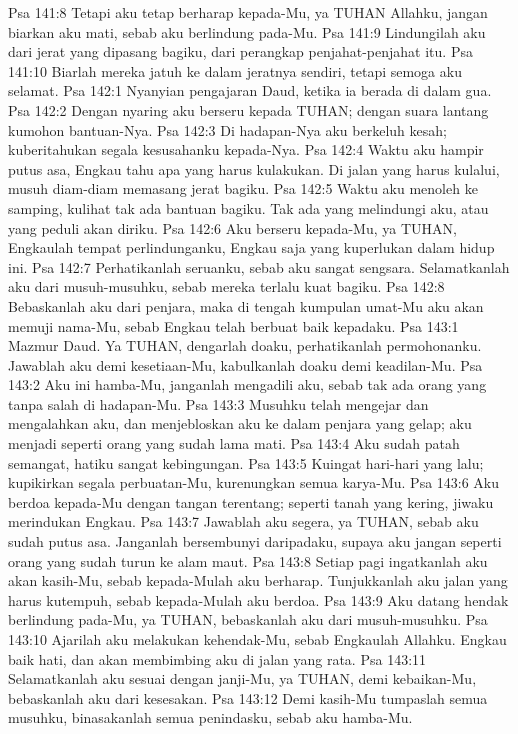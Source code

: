 Psa 141:8  Tetapi aku tetap berharap kepada-Mu, ya TUHAN Allahku, jangan biarkan aku mati, sebab aku berlindung pada-Mu.
Psa 141:9  Lindungilah aku dari jerat yang dipasang bagiku, dari perangkap penjahat-penjahat itu.
Psa 141:10  Biarlah mereka jatuh ke dalam jeratnya sendiri, tetapi semoga aku selamat.
Psa 142:1  Nyanyian pengajaran Daud, ketika ia berada di dalam gua.
Psa 142:2  Dengan nyaring aku berseru kepada TUHAN; dengan suara lantang kumohon bantuan-Nya.
Psa 142:3  Di hadapan-Nya aku berkeluh kesah; kuberitahukan segala kesusahanku kepada-Nya.
Psa 142:4  Waktu aku hampir putus asa, Engkau tahu apa yang harus kulakukan. Di jalan yang harus kulalui, musuh diam-diam memasang jerat bagiku.
Psa 142:5  Waktu aku menoleh ke samping, kulihat tak ada bantuan bagiku. Tak ada yang melindungi aku, atau yang peduli akan diriku.
Psa 142:6  Aku berseru kepada-Mu, ya TUHAN, Engkaulah tempat perlindunganku, Engkau saja yang kuperlukan dalam hidup ini.
Psa 142:7  Perhatikanlah seruanku, sebab aku sangat sengsara. Selamatkanlah aku dari musuh-musuhku, sebab mereka terlalu kuat bagiku.
Psa 142:8  Bebaskanlah aku dari penjara, maka di tengah kumpulan umat-Mu aku akan memuji nama-Mu, sebab Engkau telah berbuat baik kepadaku.
Psa 143:1  Mazmur Daud. Ya TUHAN, dengarlah doaku, perhatikanlah permohonanku. Jawablah aku demi kesetiaan-Mu, kabulkanlah doaku demi keadilan-Mu.
Psa 143:2  Aku ini hamba-Mu, janganlah mengadili aku, sebab tak ada orang yang tanpa salah di hadapan-Mu.
Psa 143:3  Musuhku telah mengejar dan mengalahkan aku, dan menjebloskan aku ke dalam penjara yang gelap; aku menjadi seperti orang yang sudah lama mati.
Psa 143:4  Aku sudah patah semangat, hatiku sangat kebingungan.
Psa 143:5  Kuingat hari-hari yang lalu; kupikirkan segala perbuatan-Mu, kurenungkan semua karya-Mu.
Psa 143:6  Aku berdoa kepada-Mu dengan tangan terentang; seperti tanah yang kering, jiwaku merindukan Engkau.
Psa 143:7  Jawablah aku segera, ya TUHAN, sebab aku sudah putus asa. Janganlah bersembunyi daripadaku, supaya aku jangan seperti orang yang sudah turun ke alam maut.
Psa 143:8  Setiap pagi ingatkanlah aku akan kasih-Mu, sebab kepada-Mulah aku berharap. Tunjukkanlah aku jalan yang harus kutempuh, sebab kepada-Mulah aku berdoa.
Psa 143:9  Aku datang hendak berlindung pada-Mu, ya TUHAN, bebaskanlah aku dari musuh-musuhku.
Psa 143:10  Ajarilah aku melakukan kehendak-Mu, sebab Engkaulah Allahku. Engkau baik hati, dan akan membimbing aku di jalan yang rata.
Psa 143:11  Selamatkanlah aku sesuai dengan janji-Mu, ya TUHAN, demi kebaikan-Mu, bebaskanlah aku dari kesesakan.
Psa 143:12  Demi kasih-Mu tumpaslah semua musuhku, binasakanlah semua penindasku, sebab aku hamba-Mu.
